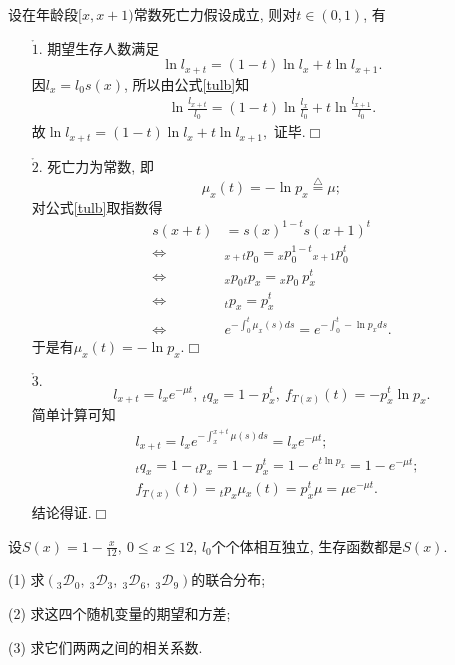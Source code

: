 \documentclass[a4paper,openany, 10pt]{ctexbook}
\def\qed{\hfill$\Box$\medskip}
\begin{document}
 \begin{proposition}设在年龄段$[x,x+1)$常数死亡力假设成立, 则对$t\in (0,1)$, 有
    \begin{enumerate}
        \item[$\mathring 1.$] 期望生存人数满足
            $$\ln l_{x+t}=(1-t)\ln l_{x}+t\ln l_{x+1}.$$
            \proof 因$l_{x}=l_{0}s(x)$, 所以由公式\eqref{tulb}知\begin{align*}
                \ln \frac{l_{x+t}}{l_{0}}=(1-t)\ln \frac{l_{x}}{l_{0}}+t\ln \frac{l_{x+1}}{l_{0}}.
            \end{align*}故$\ln l_{x+t}=(1-t)\ln l_{x}+t\ln l_{x+1},$
            证毕.\qed
        \item[$\mathring 2.$] 死亡力为常数, 即
            $$\mu _{x}(t)=-\ln p_{x}\stackrel{\triangle}{=}\mu;$$
            \proof 对公式\eqref{tulb}取指数得
            \begin{align*}
                                    s(x+t) & =s(x)^{1-t}s(x+1)^{t}                              \\
                \Longleftrightarrow & {}_{x+t}p_{0} = {}_xp_{0}^{1-t}{}_{x+1}p_{0}^t             \\
                \Longleftrightarrow & {}_{x}p_{0}{}_{t}p_x = {}_xp_{0}~p_{x}^{t}                 \\
                \Longleftrightarrow & {}_{t}p_x = p_x^t                                          \\
                \Longleftrightarrow & e^{-\int_{0}^{t}\mu_x(s)ds} = e^{-\int_{0}^{t}-\ln p_x ds}.
            \end{align*}
            于是有$\mu _{x}(t)=-\ln p_{x}$.\qed
        \item[$\mathring 3.$] $$l_{x+t}=l_{x}e^{-\mu t},\ _{t}q_{x}=1-p^{t}_{x},\ f_{T(x)}(t)=-p_{x}^{t}\ln p_{x}.$$
            \proof 简单计算可知\begin{align*}
                 & l_{x+t}=l_{x}e^{-\int_{x}^{x+t}\mu (s)ds}=l_{x}e^{-\mu t};         \\
                 & _{t}q_{x}=1-{}_{t}p_{x}=1-p_{x}^{t}=1-e^{t\ln p_{x}}=1-e^{-\mu t}; \\
                 & f_{T(x)}(t)={}_{t}p_{x}\mu {}_{x}(t)=p_{x}^{t}\mu=\mu e^{-\mu t}.
            \end{align*} 结论得证.\qed
    \end{enumerate}
\end{proposition}

\begin{example}
    设$S(x)=1-\frac{x}{12},\ 0\leq x\leq 12$, $l_{0}$个个体相互独立, 生存函数都是$S(x)$.

    (1) 求$(_{3}\mathscr D _{0},\ _{3}\mathscr D_{3},\ _{3}\mathscr D _{6},\ _{3}\mathscr D _{9})$的联合分布;

    (2) 求这四个随机变量的期望和方差;

    (3) 求它们两两之间的相关系数.
\end{example}
\end{document}
